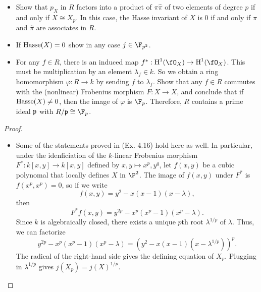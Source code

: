 \documentclass[a4paper]{article}
\begin{document}
\begin{enumerate} [label=\textbf{\arabic*.}, leftmargin=0em]
\begin{itemize}
              \item[(b)] Show that $p_X$ in $R$ factors into a product of $\pi \hat{\pi}$ of two elements of degree $p$ if and only if $X \cong X_p$.
                    In this case, the Hasse invariant of $X$ is 0 if and only if $\pi$ and $\hat{\pi}$ are associates in $R$.

              \item[(c)] If $\operatorname{Hasse}(X) = 0$ show in any case $j \in \F_{p^2}$.

              \item[(d)] For any $f \in R$, there is an induced map $f^* : \cH^1(\fO_X) \to \cH^1(\fO_X)$.
                    This must be multiplication by an element $\lambda_f \in k$.
                    So we obtain a ring homomorphism $\varphi : R \to k$ by sending $f$ to $\lambda_f$.
                    Show that any $f \in R$ commutes with the (nonlinear) Frobenius morphism $F : X \to X$, and conclude that if $\operatorname{Hasse}(X) \neq 0$, then the image of $\varphi$ is $\F_p$.
                    Therefore, $R$ contains a prime ideal $\mathfrak{p}$ with $R / \goth{p} \cong \F_p$.
          \end{itemize}

          \begin{proof} $ $ \vspace{0pt}
              \begin{itemize} [leftmargin=0cm]
                  \item[(a)] Some of the statements proved in (Ex. 4.16) hold here as well.
                        In particular, under the idenficiation of the $k$-linear Frobenius morphism $F^* : k[x, y] \to k[x, y]$ defined by $x, y \mapsto x^p , y^q$, let $f(x, y)$ be a cubic polynomal that locally defines $X$ in $\P^2$.
                        The image of $f(x, y)$ under $F^*$ is $f(x^p, x^p) = 0$, so if we write
                        \begin{equation*}
                            f(x, y) = y^2 - x(x - 1)(x - \lambda),
                        \end{equation*}
                        then
                        \begin{equation*}
                            F^*f(x, y) = y^{2p} - x^p(x^p - 1)(x^p - \lambda).
                        \end{equation*}
                        Since $k$ is algebraically closed, there exists a unique $p$th root $\lambda^{1/p}$ of $\lambda$.
                        Thus, we can factorize
                        \begin{equation*}
                            y^{2p} - x^p(x^p - 1)(x^p - \lambda) = (y^2 - x(x - 1)(x - \lambda^{1/p}))^p.
                        \end{equation*}
                        The radical of the right-hand side gives the defining equation of $X_p$.
                        Plugging in $\lambda^{1/p}$ gives $j(X_p) = j(X)^{1/p}$.


\end{itemize}
\end{proof}
\end{enumerate}
\end{document}
